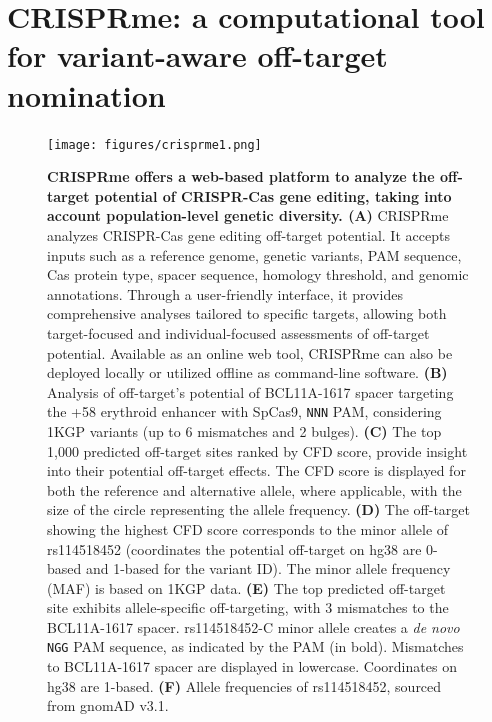 \documentclass[a4paper, titlepage, openright]{book}
\newcommand{\crisprme}{CRISPRme\xspace}
\begin{document}
\section{\crisprme: a computational tool for variant-aware off-target nomination} 

\begin{figure}[!]
	\centering
	\texttt{[image: figures/crisprme1.png]}
	\caption[\crisprme offers a web-based platform to analyze the off-target potential of CRISPR-Cas gene editing, taking into account population-level genetic diversity]{\textbf{\crisprme offers a web-based platform to analyze the off-target potential of CRISPR-Cas gene editing, taking into account population-level genetic diversity. (A)} \crisprme analyzes CRISPR-Cas gene editing off-target potential. It accepts inputs such as a reference genome, genetic variants, PAM sequence, Cas protein type, spacer sequence, homology threshold, and genomic annotations. Through a user-friendly interface, it provides comprehensive analyses tailored to specific targets, allowing both target-focused and individual-focused assessments of off-target potential. Available as an online web tool, CRISPRme can also be deployed locally or utilized offline as command-line software. \textbf{(B)} Analysis of off-target's potential of BCL11A-1617 spacer targeting the +58 erythroid enhancer with SpCas9, \texttt{NNN} PAM, considering 1KGP variants (up to 6 mismatches and 2 bulges). \textbf{(C)} The top 1,000 predicted off-target sites ranked by CFD score, provide insight into their potential off-target effects. The CFD score is displayed for both the reference and alternative allele, where applicable, with the size of the circle representing the allele frequency. \textbf{(D)} The off-target showing the highest CFD score corresponds to the minor allele of rs114518452 (coordinates the potential off-target on hg38 are 0-based and 1-based for the variant ID). The minor allele frequency (MAF) is based on 1KGP data. \textbf{(E)} The top predicted off-target site exhibits allele-specific off-targeting, with 3 mismatches to the BCL11A-1617 spacer. rs114518452-C minor allele creates a \emph{de novo} \texttt{NGG} PAM sequence, as indicated by the PAM (in bold). Mismatches to BCL11A-1617 spacer are displayed in lowercase. Coordinates on hg38 are 1-based. \textbf{(F)} Allele frequencies of rs114518452, sourced from gnomAD v3.1.}
	\label{fig:crisprme-overview}
\end{figure}
\end{document}
